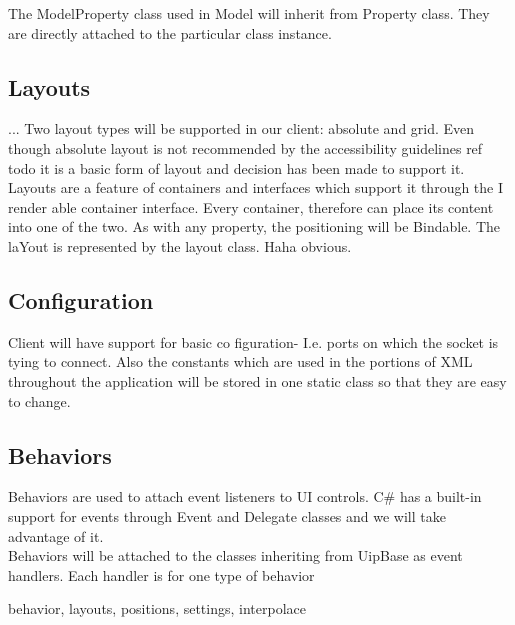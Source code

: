 The ModelProperty class used in Model will inherit from Property class. They are directly attached to the particular class instance.

\subsection{Layouts}
... Two layout types will be supported in our client: absolute and grid. Even though absolute layout is not recommended by the accessibility guidelines ref todo it is a basic form of layout and decision has been made to support it.
Layouts are a feature of containers and interfaces which support it through the I render able container interface. Every container, therefore can place its content into one of the two. As with any property, the positioning will be Bindable. The laYout is represented by the layout class. Haha obvious.

\subsection{Configuration}
Client will have support for basic co figuration- I.e. ports on which the socket is tying to connect. Also the constants which are used in the portions of XML throughout the application will be stored in one static class so that they are easy to change. 

\subsection{Behaviors}
Behaviors are used to attach event listeners to UI controls. C\# has a built-in support for events through Event and Delegate classes and we will take advantage of it.\\
Behaviors will be attached to the classes inheriting from UipBase as event handlers. Each handler is for one type of behavior 


behavior, layouts, positions, settings, interpolace
